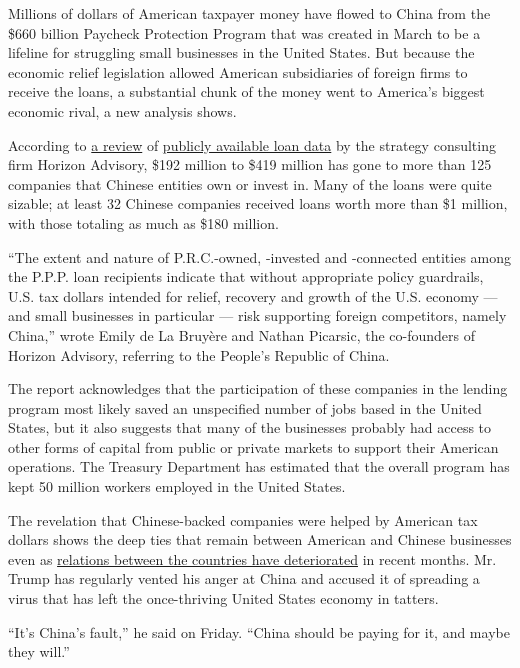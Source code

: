 Millions of dollars of American taxpayer money have flowed to China from
the \$660 billion Paycheck Protection Program that was created in March
to be a lifeline for struggling small businesses in the United States.
But because the economic relief legislation allowed American
subsidiaries of foreign firms to receive the loans, a substantial chunk
of the money went to America's biggest economic rival, a new analysis
shows.

According to \href{https://www.horizonadvisory.org/paycheckprotection}{a
review} of
\href{https://www.nytimes.com/2020/07/06/us/ppp-small-business-loans.html}{publicly
available loan data} by the strategy consulting firm Horizon Advisory,
\$192 million to \$419 million has gone to more than 125 companies that
Chinese entities own or invest in. Many of the loans were quite sizable;
at least 32 Chinese companies received loans worth more than \$1
million, with those totaling as much as \$180 million.

``The extent and nature of P.R.C.-owned, -invested and -connected
entities among the P.P.P. loan recipients indicate that without
appropriate policy guardrails, U.S. tax dollars intended for relief,
recovery and growth of the U.S. economy --- and small businesses in
particular --- risk supporting foreign competitors, namely China,''
wrote Emily de La Bruyère and Nathan Picarsic, the co-founders of
Horizon Advisory, referring to the People's Republic of China.

The report acknowledges that the participation of these companies in the
lending program most likely saved an unspecified number of jobs based in
the United States, but it also suggests that many of the businesses
probably had access to other forms of capital from public or private
markets to support their American operations. The Treasury Department
has estimated that the overall program has kept 50 million workers
employed in the United States.

The revelation that Chinese-backed companies were helped by American tax
dollars shows the deep ties that remain between American and Chinese
businesses even as
\href{https://www.nytimes.com/2020/07/25/world/asia/us-china-trump-xi.html}{relations
between the countries have deteriorated} in recent months. Mr. Trump has
regularly vented his anger at China and accused it of spreading a virus
that has left the once-thriving United States economy in tatters.

``It's China's fault,'' he said on Friday. ``China should be paying for
it, and maybe they will.''

